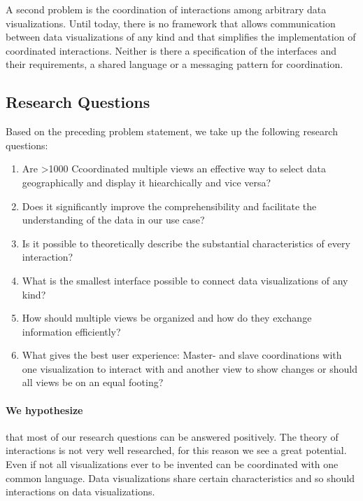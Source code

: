 \documentclass{article}
\newcommand\hmm[1]{\ifnum\ifhmode\spacefactor\else2000\fi>1000 \uppercase{#1}\else#1\fi}
\newcommand{\cmvs}{\hmm{c}oordinated multiple views}
\begin{document}
A second problem is the coordination of interactions among arbitrary data visualizations.
Until today, there is no framework that allows communication between data visualizations of any kind and that simplifies the implementation of coordinated interactions.
Neither is there a specification of the interfaces and their requirements, a shared language or a messaging pattern for coordination.

\subsection{Research Questions}

Based on the preceding problem statement, we take up the following research questions:
\begin{enumerate}
  \item
    Are \cmvs{} an effective way to select data geographically and display it hiearchically and vice versa?
  \item
    Does it significantly improve the comprehensibility and facilitate the understanding of the data in our use case?
  \item
    Is it possible to theoretically describe the substantial characteristics of every interaction?
  \item
    What is the smallest interface possible to connect data visualizations of any kind?
  \item
    How should multiple views be organized and how do they exchange information efficiently?
  \item
    What gives the best user experience:
    Master- and slave coordinations with one visualization to interact with and another view to show changes or should all views be on an equal footing?
\end{enumerate}


\paragraph{We hypothesize} that most of our research questions can be answered positively.
The theory of interactions is not very well researched, for this reason we see a great potential.
Even if not all visualizations ever to be invented can be coordinated with one common language.
Data visualizations share certain characteristics and so should interactions on data visualizations.


\end{document}
